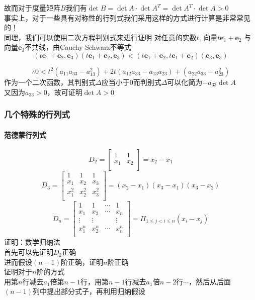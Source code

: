 \documentclass{article}
\newcommand{\ve}{\boldsymbol}
\begin{document}
\begin{CJK}{UTF8}{gkai}
故而对于度量矩阵$B$我们有$\det B=\det A\cdot \det A^T=\det A^T\cdot \det A>0$\\

事实上，对于一些具有对称性的行列式我们采用这样的方式进行计算是非常常见的！ \\
同理，我们可以使用二次方程判别式来进行证明
对任意的实数$t$, 向量$t\ve{e}_1+\ve{e}_2$ 与
向量$\ve{e}_3$不共线，由Cauchy-Schwarz不等式
\[(t\ve{e}_1+\ve{e}_2,\ve{e}_3)(t\ve{e}_1+\ve{e}_2,\ve{e}_3)<(t\ve{e}_1+\ve{e}_2,t\ve{e}_1+\ve{e}_2)(\ve{e}_3,\ve{e}_3)\]

\[\therefore 0<t^2(a_{11}a_{33}-a_{13}^2)+2t(a_{12}a_{33}-a_{13}a_{23})+(a_{22}a_{33}-a_{23}^2)\]
作为一个二次函数，其判别式$\Delta$应当小于$0$而判别式$\Delta$可以化简为$-a_{33}\det A$\\
又因为$a_{33}>0$，故可证明$\det A>0$
\subsubsection{几个特殊的行列式}
\paragraph{范德蒙行列式}

\[D_2=\begin{bmatrix}
1&1\\
x_1&x_2\\
\end{bmatrix}
=x_2-x_1\]
\[D_3=\begin{bmatrix}
1&1&1\\
x_1&x_2&x_3\\
x_1^2&x_2^2&x_3^2\\
\end{bmatrix}
=(x_2-x_1)(x_3-x_1)(x_3-x_2)\]
\[D_n=\begin{bmatrix}
1&1&\cdots&1\\
x_1&x_2&\cdots&x_n\\
\vdots&\vdots&&\vdots\\
x_1^n&x_2^n&\cdots&x_n^n\\
\end{bmatrix}
=\Pi_{1\leq j< i\leq n} (x_i-x_j)\]
证明：数学归纳法\\
首先可以先证明$D_2$正确\\
进而假设$(n-1)$阶正确，证明$n$阶正确\\
证明对于$n$阶的方式\\
用第$n$行减去$a_1$倍第$n-1$行，用第$n-1$行减去$a_1$倍$n-2$行$\cdots$，然后从后面$(n-1)$列中提出部分式子，再利用归纳假设\\

\end{CJK}
\end{document}
